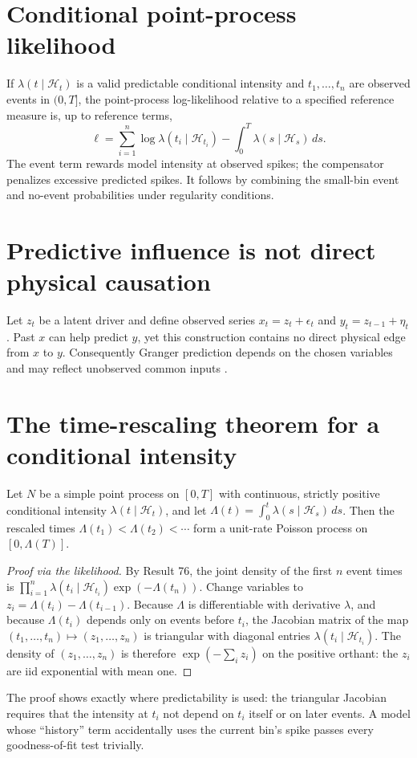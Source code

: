 \section{Conditional point-process likelihood}
If $\lambda(t\mid\mathcal H_t)$ is a valid predictable
conditional intensity and $t_1,\ldots,t_n$ are observed events
in $(0,T]$, the point-process log-likelihood relative to a
specified reference measure is, up to reference terms,
\[
\ell=\sum_{i=1}^n\log\lambda(t_i\mid\mathcal H_{t_i})
-\int_0^T\lambda(s\mid\mathcal H_s)\,ds.
\]
The event term rewards model intensity at observed spikes;
the compensator penalizes excessive predicted spikes.
It follows by combining the small-bin event and no-event
probabilities under regularity conditions.

\section{Predictive influence is not direct physical causation}
Let $z_t$ be a latent driver and define observed series
$x_t=z_t+\epsilon_t$ and $y_t=z_{t-1}+\eta_t$.
Past $x$ can help predict $y$, yet this construction contains
no direct physical edge from $x$ to $y$.
Consequently Granger prediction depends on the chosen
variables and may reflect unobserved common inputs
\cite{bastos2016,cekic2018}.
\section{The time-rescaling theorem for a conditional intensity}
\begin{theorem}
Let $N$ be a simple point process on $[0,T]$ with continuous, strictly
positive conditional intensity $\lambda(t\mid\mathcal H_t)$, and let
$\Lambda(t)=\int_0^t\lambda(s\mid\mathcal H_s)\,ds$. Then the rescaled
times $\Lambda(t_1)<\Lambda(t_2)<\cdots$ form a unit-rate Poisson process
on $[0,\Lambda(T)]$.
\end{theorem}
\begin{proof}[Proof via the likelihood]
By Result 76, the joint density of the first $n$ event times is
$\prod_{i=1}^n\lambda(t_i\mid\mathcal H_{t_i})\exp(-\Lambda(t_n))$.
Change variables to $z_i=\Lambda(t_i)-\Lambda(t_{i-1})$. Because
$\Lambda$ is differentiable with derivative $\lambda$, and because
$\Lambda(t_i)$ depends only on events before $t_i$, the Jacobian matrix
of the map $(t_1,\ldots,t_n)\mapsto(z_1,\ldots,z_n)$ is triangular with
diagonal entries $\lambda(t_i\mid\mathcal H_{t_i})$. The density of
$(z_1,\ldots,z_n)$ is therefore
$\exp(-\sum_iz_i)$ on the positive orthant: the $z_i$ are iid
exponential with mean one.
\end{proof}
The proof shows exactly where predictability is used: the triangular
Jacobian requires that the intensity at $t_i$ not depend on $t_i$ itself
or on later events. A model whose ``history'' term accidentally uses the
current bin's spike passes every goodness-of-fit test trivially.

